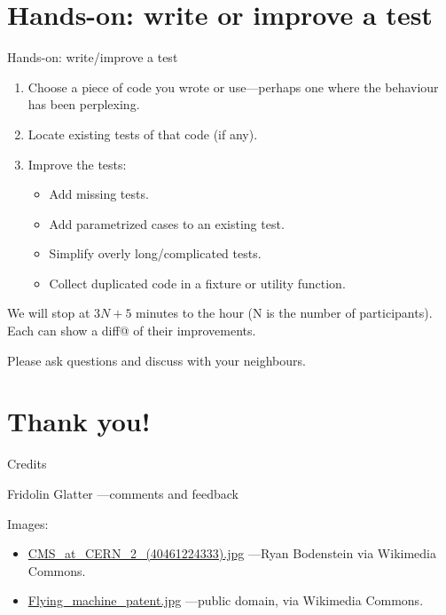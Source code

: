 \documentclass[12pt,aspectratio=169]{beamer}
\begin{document}
\section{Hands-on: write or improve a test}
\begin{frame}[fragile]{Hands-on: write/improve a test}

\begin{enumerate}
  \item Choose a piece of code you wrote or use—perhaps one where the behaviour has been perplexing.
  \item Locate existing tests of that code (if any).
  \item Improve the tests:
  \begin{itemize}
    \item Add missing tests.
    \item Add parametrized cases to an existing test.
    \item Simplify overly long/complicated tests.
    \item Collect duplicated code in a fixture or utility function.
  \end{itemize}
\end{enumerate}

\medskip
We will stop at $3N+5$ minutes to the hour (N is the number of participants).
Each can show a \verb@git diff@ of their improvements.

\smallskip
Please ask questions and discuss with your neighbours.
\end{frame}

\section*{Thank you!}

\begin{frame}{Credits}

Fridolin Glatter —comments and feedback

\medskip
Images:
\begin{itemize}
  \item \href{https://commons.wikimedia.org/wiki/File:CMS_at_CERN_2_(40461224333).jpg}{CMS\_at\_CERN\_2\_(40461224333).jpg} —Ryan Bodenstein via Wikimedia Commons.
  \item \href{https://commons.wikimedia.org/wiki/File:Flying_machine_patent.jpg}{Flying\_machine\_patent.jpg} —public domain, via Wikimedia Commons.
\end{itemize}
\end{frame}
\end{document}
